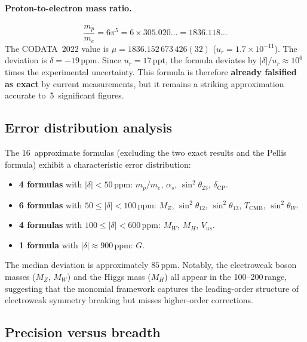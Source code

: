 \documentclass[11pt,a4paper]{article}
\newcommand{\ppm}{\,\mathrm{ppm}}
\newcommand{\ppt}{\,\mathrm{ppt}}
\begin{document}
\paragraph{Proton-to-electron mass ratio.}
\begin{equation}
  \frac{m_p}{m_e} = 6\pi^{5} = 6\times 305.020\ldots = 1836.118\ldots
  \label{eq:mpme}
\end{equation}
The CODATA~2022 value is $\mu = 1836.152\,673\,426(32)$
($u_r = 1.7\times 10^{-11}$). The deviation is
$\delta = -19\ppm$. Since $u_r = 17\ppt$, the formula deviates by
$|\delta|/u_r \approx 10^{6}$ times the experimental uncertainty. This formula
is therefore \textbf{already falsified as exact} by current measurements, but
it remains a striking approximation accurate to~5~significant figures.

\subsection{Error distribution analysis}\label{sec:errors}

The 16~approximate formulas (excluding the two exact results and the Pellis
formula) exhibit a characteristic error distribution:

\begin{itemize}
\item \textbf{4 formulas} with $|\delta|<50\ppm$: $m_p/m_e$, $\alpha_s$,
  $\sin^{2}\!\theta_{23}$, $\delta_{\mathrm{CP}}$.
\item \textbf{6 formulas} with $50\leq|\delta|<100\ppm$: $M_Z$,
  $\sin^{2}\!\theta_{12}$, $\sin^{2}\!\theta_{13}$, $T_{\mathrm{CMB}}$,
  $\sin^{2}\!\theta_W$.
\item \textbf{4 formulas} with $100\leq|\delta|<600\ppm$: $M_W$, $M_H$,
  $V_{us}$.
\item \textbf{1 formula} with $|\delta|\approx 900\ppm$: $G$.
\end{itemize}

The median deviation is approximately $85\ppm$. Notably, the electroweak
boson masses ($M_Z$, $M_W$) and the Higgs mass ($M_H$) all appear in the
100--200\ppm range, suggesting that the monomial framework captures the
leading-order structure of electroweak symmetry breaking but misses
higher-order corrections.

\subsection{Precision versus breadth}\label{sec:precision}
\end{document}
